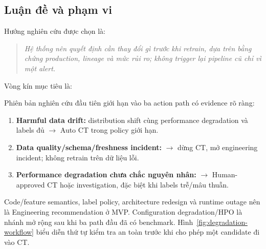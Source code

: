 \documentclass[11pt,a4paper]{article}
\begin{document}
\subsection{Luận đề và phạm vi}
Hướng nghiên cứu được chọn là:\newline
\begin{quote}
\emph{Hệ thống nên quyết định cần thay đổi gì trước khi retrain, dựa trên bằng chứng production, lineage và mức rủi ro; không trigger lại pipeline cũ chỉ vì một alert.}
\end{quote}

Vòng kín mục tiêu là:

\begin{center}
\end{center}

Phiên bản nghiên cứu đầu tiên giới hạn vào ba action path có evidence rõ ràng:
\begin{enumerate}
  \item \textbf{Harmful data drift:} distribution shift cùng performance degradation và labels đủ $\rightarrow$ Auto CT trong policy giới hạn.
  \item \textbf{Data quality/schema/freshness incident:} $\rightarrow$ dừng CT, mở engineering incident; không retrain trên dữ liệu lỗi.
  \item \textbf{Performance degradation chưa chắc nguyên nhân:} $\rightarrow$ Human-approved CT hoặc investigation, đặc biệt khi labels trễ/mâu thuẫn.
\end{enumerate}
Code/feature semantics, label policy, architecture redesign và runtime outage nên là Engineering recommendation ở MVP. Configuration degradation/HPO là nhánh mở rộng sau khi ba path đầu đã có benchmark.
Hình~\ref{fig:degradation-workflow} biểu diễn thứ tự kiểm tra an toàn trước khi cho phép một candidate đi vào CT.
\end{document}
